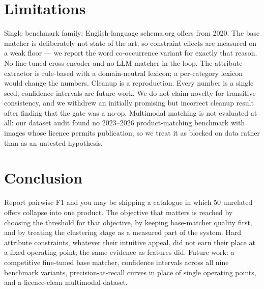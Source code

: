 \documentclass[conference]{IEEEtran}
\begin{document}
\section{Limitations}
Single benchmark family; English-language schema.org offers from 2020. The base matcher is deliberately
not state of the art, so constraint effects are measured on a weak floor --- we report the word
co-occurrence variant for exactly that reason. No fine-tuned cross-encoder and no LLM matcher in the loop.
The attribute extractor is rule-based with a domain-neutral lexicon; a per-category lexicon would change
the numbers. Cleanup is a reproduction. Every number is a single seed; confidence intervals are future
work. We do not claim novelty for transitive consistency, and we withdrew an initially promising but
incorrect cleanup result after finding that the gate was a no-op. Multimodal matching is not evaluated at
all: our dataset audit found no 2023--2026 product-matching benchmark with images whose licence permits
publication, so we treat it as blocked on data rather than as an untested hypothesis.

\section{Conclusion}
Report pairwise F1 and you may be shipping a catalogue in which 50 unrelated offers collapse into one
product. The objective that matters is reached by choosing the threshold for that objective, by keeping
base-matcher quality first, and by treating the clustering stage as a measured part of the system. Hard
attribute constraints, whatever their intuitive appeal, did not earn their place at a fixed operating point;
the same evidence as features did. Future work: a competitive fine-tuned base matcher, confidence intervals
across all nine benchmark variants, precision-at-recall curves in place of single operating points, and a
licence-clean multimodal dataset.



\end{document}
